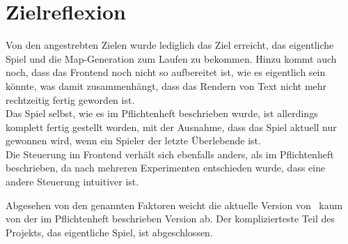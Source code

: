 \section{Zielreflexion}
Von den angestrebten Zielen wurde lediglich das Ziel erreicht, das eigentliche Spiel und die Map-Generation zum Laufen zu bekommen.
Hinzu kommt auch noch, dass das Frontend noch nicht so aufbereitet ist, wie es eigentlich sein könnte, was damit zusammenhängt, dass das Rendern von Text nicht mehr rechtzeitig fertig geworden ist. \\
Das Spiel selbst, wie es im Pflichtenheft beschrieben wurde, ist allerdings komplett fertig gestellt worden, mit der Ausnahme, dass das Spiel aktuell nur gewonnen wird, wenn ein Spieler der letzte Überlebende ist. \\
Die Steuerung im Frontend verhält sich ebenfalls anders, als im Pflichtenheft beschrieben, da nach mehreren Experimenten entschieden wurde, dass eine andere Steuerung intuitiver ist.

Abgesehen von den genannten Faktoren weicht die aktuelle Version von \vires\ kaum von der im Pflichtenheft beschrieben Version ab. Der komplizierteste Teil des Projekts, das eigentliche Spiel, ist abgeschlossen.